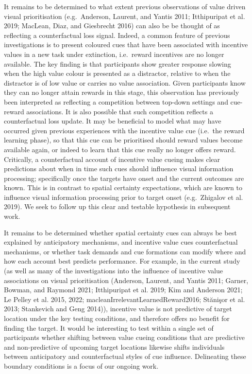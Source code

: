 \documentclass[11pt,halfline,a4paper,]{ouparticle}
\begin{document}
It remains to be determined to what extent previous observations of value driven visual prioritisation (e.g.~Anderson, Laurent, and Yantis 2011; Itthipuripat et al. 2019; MacLean, Diaz, and Giesbrecht 2016) can also be be thought of as reflecting a counterfactual loss signal. Indeed, a common feature of previous investigations is to present coloured cues that have been associated with incentive values in a new task under extinction, i.e.~reward incentives are no longer available. The key finding is that participants show greater response slowing when the high value colour is presented as a distractor, relative to when the distractor is of low value or carries no value association. Given participants know they can no longer attain rewards in this stage, this observation has previously been interpreted as reflecting a competition between top-down settings and cue-reward associations. It is also possible that such competition reflects a counterfactual loss update. It may be beneficial to model what may have occurred given previous experiences with the incentive value cue (i.e.~the reward learning phase), so that this cue can be prioritised should reward values become available again, or indeed to learn that this cue really no longer offers reward. Critically, a counterfactual account of incentive value cueing makes clear predictions about when in time such cues should influence visual information processing; specifically once the targets have onset and the current outcomes are known. This is in contrast to spatial certainty expectations, which are known to influence visual information processing prior to target onset (e.g.~Zhigalov et al. 2019). We seek to follow up this clear and testable hypothesis in subsequent work.

It remains to be determined whether spatial certainty cues can always be best explained by anticipatory mechanisms, and incentive value cues counterfactual mechanisms, or whether task demands and cue formations can modify where and how each account best predicts performance. For example, in the current study (as well as many of the investigations into the influence of incentive value associations on visual prioritisation (Anderson, Laurent, and Yantis 2011; Garner, Bowman, and Raymond 2021; Itthipuripat et al. 2019; Kim and Anderson 2021; Le Pelley et al. 2015, 2022; macleanIrrelevantLearnedReward2016; Stănişor et al. 2013; Stankevich and Geng 2014)), incentive value is not predictive of target location under the key testing conditions, and therefore offers no benefit for finding the target. It would be interesting to test within a single set of participants whether shifting between value cueing conditions that are predictive and non-predictive of upcoming target locations likewise shifts individuals between anticipatory and counterfactual styles of cue influence. Delineating these boundary conditions is a focus of our ongoing work.
\end{document}
